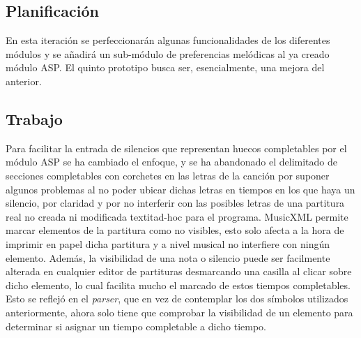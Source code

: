 \subsection{Planificación}
 En esta iteración se perfeccionarán algunas funcionalidades de los diferentes módulos y se añadirá un sub-módulo de preferencias melódicas al ya creado módulo ASP. El quinto prototipo busca ser, esencialmente, una mejora del anterior.

\subsection{Trabajo}
Para facilitar la entrada de silencios que representan huecos completables por el módulo ASP se ha cambiado el enfoque, y se ha abandonado el delimitado de secciones completables con corchetes en las letras de la canción por suponer algunos problemas al no poder ubicar dichas letras en tiempos en los que haya un silencio, por claridad y por no interferir con las posibles letras de una partitura real no creada ni modificada textit{ad-hoc} para el programa. MusicXML permite marcar elementos de la partitura como no visibles, esto solo afecta a la hora de imprimir en papel dicha partitura y a nivel musical no interfiere con ningún elemento. Además, la visibilidad de una nota o silencio puede ser facilmente alterada en cualquier editor de partituras desmarcando una casilla al clicar sobre dicho elemento, lo cual facilita mucho el marcado de estos tiempos completables. Esto se reflejó en el \textit{parser}, que en vez de contemplar los dos símbolos utilizados anteriormente, ahora solo tiene que comprobar la visibilidad de un elemento para determinar si asignar un tiempo completable a dicho tiempo.

